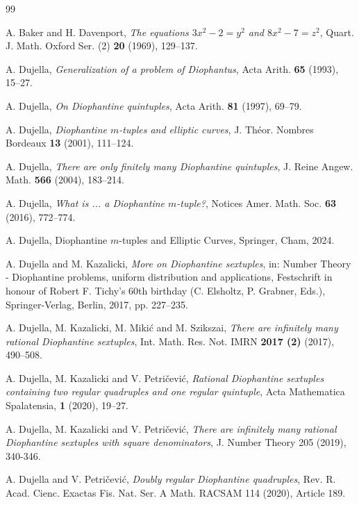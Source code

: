\documentclass[a4paper]{amsart}
\theoremstyle{plain}
\theoremstyle{definition}
\begin{document}
\begin{thebibliography}{99}
	


A. Baker and H. Davenport, {\it The equations $3x^2 - 2 = y^2$ and $8x^2 - 7 = z^2$},
Quart. J. Math. Oxford Ser. (2) {\bf 20} (1969), 129--137.


A. Dujella,
{\it  Generalization of a problem of Diophantus}, Acta Arith. {\bf 65} (1993), 15--27.

A. Dujella,
{\it On Diophantine quintuples}, Acta Arith. {\bf 81} (1997), 69--79.

A. Dujella, {\it Diophantine $m$-tuples and elliptic curves},
J. Th\'eor. Nombres Bordeaux {\bf 13} (2001), 111--124.

A. Dujella, {\it There are only finitely many Diophantine quintuples},
 J. Reine Angew. Math. {\bf 566} (2004), 183--214.

A. Dujella, {\it What is ... a Diophantine $m$-tuple?}, Notices Amer. Math. Soc. {\bf 63} (2016), 772--774.

A. Dujella, Diophantine $m$-tuples and Elliptic Curves, Springer, Cham, 2024.

A. Dujella and M. Kazalicki, {\it More on Diophantine sextuples}, in: Number Theory - Diophantine problems, uniform distribution and applications, Festschrift in honour of Robert F. Tichy's 60th birthday (C. Elsholtz, P. Grabner, Eds.), Springer-Verlag, Berlin, 2017, pp. 227--235.

A. Dujella, M. Kazalicki, M. Miki\'c and M. Szikszai, {\it There are infinitely many rational
Diophantine sextuples}, Int. Math. Res. Not. IMRN {\bf 2017 (2)} (2017), 490--508.

A. Dujella, M. Kazalicki and V. Petri\v{c}evi\'c,
{\it Rational Diophantine sextuples containing two regular quadruples and one regular quintuple},  Acta Mathematica Spalatensia,  {\bf 1} (2020), 19--27.

A. Dujella, M. Kazalicki and V. Petri\v{c}evi\'c,
{\it There are infinitely many rational Diophantine sextuples with square denominators}, J. Number Theory 205 (2019), 340-346.


A. Dujella and V. Petri\v{c}evi\'c,
{\it Doubly regular Diophantine quadruples}, Rev. R. Acad. Cienc. Exactas Fis. Nat. Ser. A Math. RACSAM 114 (2020), Article 189.


\end{thebibliography}
\end{document}
